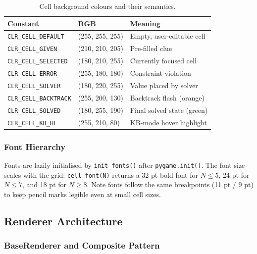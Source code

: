 \begin{table}[h]
  \centering
  \caption{Cell background colours and their semantics.}
  \label{tab:theme_colours}
  \begin{tabular}{lll}
    \toprule
    Constant & RGB & Meaning \\
    \midrule
    \texttt{CLR\_CELL\_DEFAULT}   & (255, 255, 255) & Empty, user-editable cell \\
    \texttt{CLR\_CELL\_GIVEN}     & (210, 210, 205) & Pre-filled clue \\
    \texttt{CLR\_CELL\_SELECTED}  & (180, 210, 255) & Currently focused cell \\
    \texttt{CLR\_CELL\_ERROR}     & (255, 180, 180) & Constraint violation \\
    \texttt{CLR\_CELL\_SOLVER}    & (180, 220, 255) & Value placed by solver \\
    \texttt{CLR\_CELL\_BACKTRACK} & (255, 200, 130) & Backtrack flash (orange) \\
    \texttt{CLR\_CELL\_SOLVED}    & (180, 255, 190) & Final solved state (green) \\
    \texttt{CLR\_CELL\_KB\_HL}    & (255, 210,  80) & KB-mode hover highlight \\
    \bottomrule
  \end{tabular}
\end{table}

\subsubsection{Font Hierarchy}

Fonts are lazily initialised by \texttt{init\_fonts()} after \texttt{pygame.init()}.
The font size scales with the grid: \texttt{cell\_font(N)} returns a 32 pt bold
font for $N \le 5$, 24 pt for $N \le 7$, and 18 pt for $N \ge 8$.
Note fonts follow the same breakpoints (11 pt / 9 pt) to keep pencil marks
legible even at small cell sizes.

\subsection{Renderer Architecture}
\label{sec:ui_renderers}

\subsubsection{BaseRenderer and Composite Pattern}

